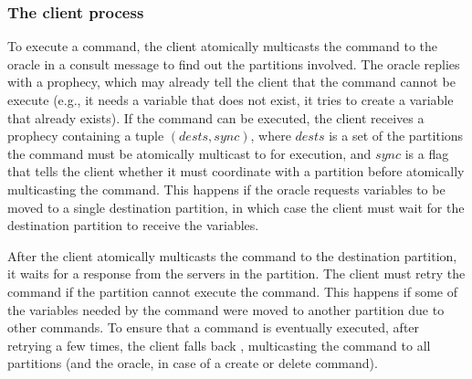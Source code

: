 






\subsubsection{The client process} 

To execute a command, the client atomically multicasts the command to the oracle in a consult message to find out the partitions involved.
The oracle replies with a prophecy, which may already tell the client that the command cannot be execute (e.g., it needs a variable that does not exist, it tries to create a variable that already exists).
If the command can be executed, the client receives a prophecy containing a tuple $(dests, sync)$, where $dests$ is a set of the partitions the command must be atomically multicast to for execution, and $sync$ is a flag that tells the client whether it must coordinate with a partition before atomically multicasting the command.
This happens if the oracle requests variables to be moved to a single destination partition, in which case the client must wait for the destination partition to receive the variables.

After the client atomically multicasts the command to the destination partition, it waits for a response from the servers in the partition.
The client must retry the command if the partition cannot execute the command.
This happens if some of the variables needed by the command were moved to another partition due to other commands. 
To ensure that a command is eventually executed, after retrying a few times, the client falls back \ssmr{}, multicasting the command to all partitions (and the oracle, in case of a create or delete command).

